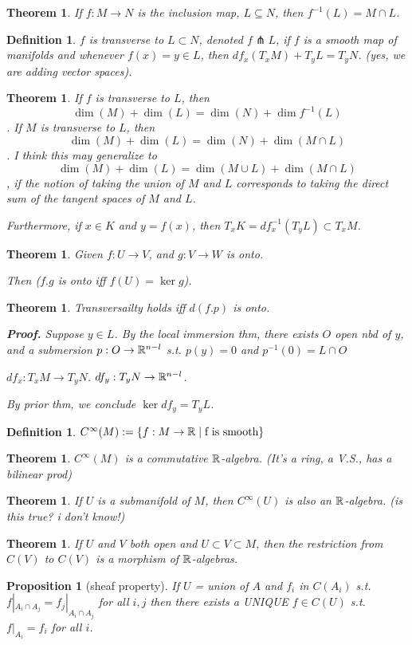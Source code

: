 \documentclass[11pt]{amsbook}
\newenvironment{dateenv}{
	\vspace{1em}
}{
	\vspace{1em}
}
\newcommand{\mydate}[4]{
	\newdate{#1}{#2}{#3}{#4}
	\begin{dateenv}
		\hfill\displaydate{#1}
	\end{dateenv}
}
\theoremstyle{mystyle} \newtheorem{thrm}[thm]{Theorem}
\theoremstyle{mystyle} \newtheorem{defi}[thm]{Definition}
\theoremstyle{mystyle} \newtheorem{coro}[thm]{Corollary}
\theoremstyle{mystyle} \newtheorem{propo}[thm]{Proposition}
\theoremstyle{mystyle} \newtheorem{lemm}[thm]{Lemma}
\numberwithin{thm}{section}
\newcommand{\transverse}{\pitchfork}
\newcommand{\de}{\emph}
\begin{document}
\begin{thrm}
	If $f: M \to N$ is the inclusion map, $L \subseteq N$, then $f^{-1}(L) = M \cap L$.
\end{thrm}

\begin{defi}
	$f$ is \de{transverse} to $L \subset N$, denoted $f \transverse L$, if $f$ is a smooth map of manifolds and whenever $f(x) = y \in L$, then $df_x(T_xM) + T_yL = T_yN$.  (yes, we are adding vector spaces).
\end{defi}

\begin{thrm}
	If $f$ is transverse to $L$, then $$\dim(M) + \dim(L) = \dim(N) + \dim f^{-1}(L)$$.
	If $M$ is transverse to $L$, then $$\dim(M) + \dim(L) = \dim(N) + \dim(M \cap L)$$.
	I think this may generalize to $$\dim(M) + \dim(L) = \dim(M \cup L) + \dim(M \cap L)$$, if the notion of taking the union of $M$ and $L$ corresponds to taking the direct sum of the tangent spaces of $M$ and $L$.

	Furthermore, if $x \in K$ and $y = f(x)$, then $T_x K = df^{-1}_x(T_y L) \subset T_x M$.
\end{thrm}

\begin{thrm}
	Given $f : U \to V$, and
	$g : V \to W$ is onto.

	Then ($f.g$ is onto iff $f(U) = \ker g$).
\end{thrm}

\begin{thrm}
	Transversailty holds iff $d(f.p)$ is onto.

	\textbf{Proof.}
	Suppose $y \in L$.
	By the local immersion thm,
	there exists $O$ open nbd of $y$, and a submersion $p : O \to {\mathbb R}^{n-l}$
	s.t. $p(y) = 0$ and $p^{-1}(0) = L \cap O$

	$df_x : T_xM \to T_yN$.
	$df_y : T_yN \to {\mathbb R}^{n-l}$.

	By prior thm, we conclude $\ker df_y = T_yL$.
\end{thrm}

\mydate{d4}{5}{10}{2016}

\begin{defi}
	$C^\infty(M) := \{ f:M \to {\mathbb R} \mid \text{f is smooth} \}$
\end{defi}
\begin{thrm}
	$C^\infty(M)$ is a commutative ${\mathbb R}$-algebra. (It's a ring, a V.S., has a bilinear prod)
\end{thrm}
\begin{thrm}
	If $U$ is a submanifold of $M$, then $C^\infty(U)$ is also an ${\mathbb R}$-algebra.
	(is this true?  i don't know!)
\end{thrm}
\begin{thrm}
	If $U$ and $V$ both open and $U \subset V \subset M$, then
	the restriction from $C(V)$ to $C(V)$ is a morphism of ${\mathbb R}$-algebras.
\end{thrm}
\begin{propo}[sheaf property]
	If $U$ = union of $A$
	and $f_i$ in $C(A_i)$ s.t. $f|_{A_i \cap A_j} = f_j|_{A_i \cap A_j}$ for all $i, j$
	then there exists a UNIQUE $f \in C(U)$ s.t. $f|_{A_i} = f_i$ for all $i$.
\end{propo}
\end{document}
